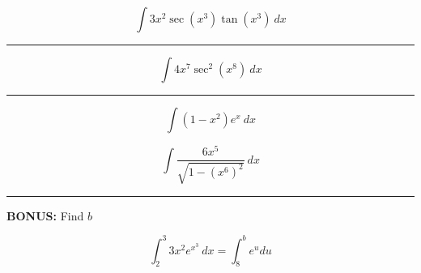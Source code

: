 \documentclass{article}
\begin{document}
\begin{landscape}
\thispagestyle{empty}

\begin{multicols}{2}

{\Huge

$$
\int 3x^2 \sec(x^3)\tan(x^3)\ dx 
$$
\vspace{0.3in}
\hrule
\vspace{0.3in}

$$
\int 4x^7\sec^2\left(x^8\right) \ dx
$$

\vspace{0.3in}
\hrule
\vspace{0.3in}

$$
\int \left(1-x^2\right)e^x \ dx
$$

\columnbreak


$$
\int \frac{6x^5}{\sqrt{1-\left(x^6\right)^2}} \ dx 
$$


\vspace{0.3in}
\hrule
\vspace{0.3in}

\begin{center}{\bf BONUS: } Find $b$
\end{center}

$$
\int_2^3 3x^2 e^{x^3} \ dx = \int_8^b e^u du 
$$

}

\end{multicols}
\end{landscape}
\end{document}
